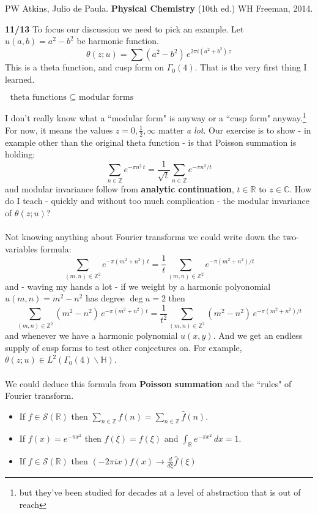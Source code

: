 \documentclass[12pt]{article}
\begin{document}
\begin{thebibliography}{}

\item PW Atkins, Julio de Paula. \textbf{Physical Chemistry} (10th ed.) WH Freeman, 2014.

\end{thebibliography}

\newpage

\noindent \textbf{11/13} To focus our discussion we need to pick an example.  Let $u(a,b) = a^2 - b^2$ be harmonic function.
$$ \theta(z;u) = \sum (a^2 - b^2) \, e^{2\pi i (a^2 + b^2 )\,z } $$
This is a theta function, and cusp form on $\Gamma_0(4)$.  That is the very first thing I learned.
\begin{center}
$\text{ theta functions } \subseteq \text{ modular forms }$  
\end{center}
I don't really know what a ``modular form" is anyway or a ``cusp form" anyway.\footnote{but they've been studied for decades at a level of abstraction that is out of reach}  For now, it means the values $z = 0, \frac{1}{2}, \infty$ matter \textit{a lot}.  Our exercise is to show - in example other than the original theta function - is that Poisson summation is holding:
$$ \sum_{n \in \mathbb{Z}} e^{- \pi n^2 \, t} =  \frac{1}{\sqrt{t}} \sum_{n \in \mathbb{Z}} e^{-\pi n^2 /t} $$
and modular invariance follow from \textbf{analytic continuation}, $t \in \mathbb{R}$ to $z \in \mathbb{C}$.  How do I teach - quickly and without too much complication - the modular invariance of $\theta(z;u)$? \\ \\
Not knowing anything about Fourier transforms we could write down the two-variables formula:
$$ 
\sum_{(m,n) \in \mathbb{Z}^2} e^{- \pi ( m^2 + n^2 ) \, t} =  \frac{1}{t} 
\sum_{(m,n) \in \mathbb{Z}^2} e^{- \pi ( m^2 + n^2 ) /t} $$
and - waving my hands a lot - if we weight by a harmonic polyonomial $u(m,n) = m^2 - n^2$ has degree $\deg u = 2$ then 
$$ 
\sum_{(m,n) \in \mathbb{Z}^2} (m^2 - n^2 )\, e^{- \pi ( m^2 + n^2 ) \, t} =  \frac{1}{t^2} 
\sum_{(m,n) \in \mathbb{Z}^2} (m^2 - n^2 )\, e^{- \pi ( m^2 + n^2 ) /t} $$
and whenever we have a harmonic polynomial $u(x,y)$.  And we get an endless supply of cusp forms to test other conjectures on.  For example, $\theta(z;u) \in L^2 (\Gamma_0(4) \backslash \mathbb{H}) $. \\ \\
We could deduce this formula from \textbf{Poisson summation} and the ``rules" of Fourier transform.
\begin{itemize}
\item If $f \in \mathcal{S}(\mathbb{R})$ \hspace{1.2em} then $\sum_{n \in \mathbb{Z}} f(n) = \sum_{n \in \mathbb{Z}} \widehat{f}(n)$.
\item If $f(x) = e^{-\pi x^2 }$ then $\widehat{f}(\xi) = f(\xi)$ and $\int_\mathbb{R} e^{-\pi x^2} \, dx = 1$.
\item If $f \in \mathcal{S}(\mathbb{R})$ \hspace{1.2em} then $(-2\pi i x) f(x) \to \frac{d}{d\xi} \widehat{f}(\xi)$
\end{itemize}
\end{document}
